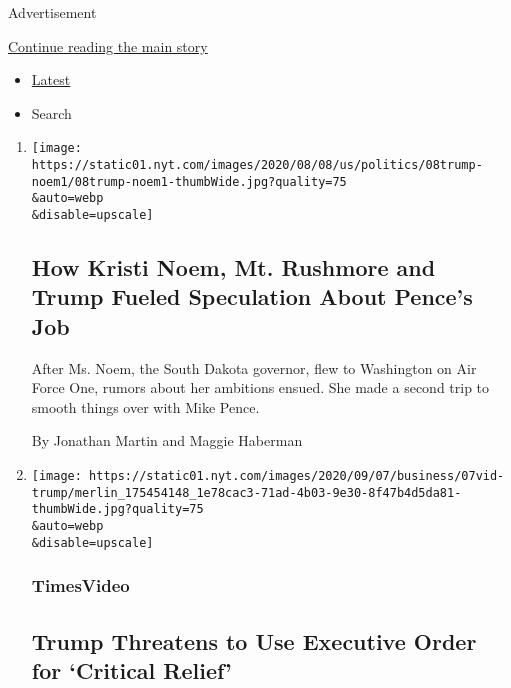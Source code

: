 Advertisement

\protect\hyperlink{after-mid1}{Continue reading the main story}

\begin{itemize}
\tightlist
\item
  \protect\hyperlink{stream-panel}{Latest}
\item
  Search
\end{itemize}

\begin{enumerate}
\def\labelenumi{\arabic{enumi}.}
\item
  \href{/2020/08/08/us/politics/kristi-noem-pence-trump.html}{}

  \texttt{[image: https://static01.nyt.com/images/2020/08/08/us/politics/08trump-noem1/08trump-noem1-thumbWide.jpg?quality=75\\\&auto=webp\\\&disable=upscale]}

  \hypertarget{how-kristi-noem-mt-rushmore-and-trump-fueled-speculation-about-pences-job}{%
  \subsection{How Kristi Noem, Mt. Rushmore and Trump Fueled Speculation
  About Pence's
  Job}\label{how-kristi-noem-mt-rushmore-and-trump-fueled-speculation-about-pences-job}}

  After Ms. Noem, the South Dakota governor, flew to Washington on Air
  Force One, rumors about her ambitions ensued. She made a second trip
  to smooth things over with Mike Pence.

  By Jonathan Martin and Maggie Haberman
\item
  \href{/video/us/politics/100000007279339/trump-says-he-will-act-on-his-own-if-congress-doesnt-agree-on-relief.html}{}

  \texttt{[image: https://static01.nyt.com/images/2020/09/07/business/07vid-trump/merlin\_175454148\_1e78cac3-71ad-4b03-9e30-8f47b4d5da81-thumbWide.jpg?quality=75\\\&auto=webp\\\&disable=upscale]}

  \hypertarget{timesvideo}{%
  \subsubsection{TimesVideo}\label{timesvideo}}

  \hypertarget{trump-threatens-to-use-executive-order-for-critical-relief}{%
  \subsection{Trump Threatens to Use Executive Order for `Critical
  Relief'}\label{trump-threatens-to-use-executive-order-for-critical-relief}}


\end{enumerate}
